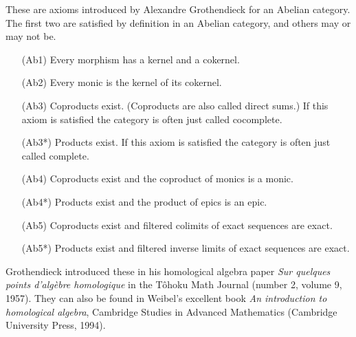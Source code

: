 \documentclass{article}
\begin{document}
These are axioms introduced by Alexandre Grothendieck for an Abelian category.  The first two are satisfied by definition in an Abelian category, and others may or may not be.

\begin{itemize}
  \item[(Ab1)] Every morphism has a kernel and a cokernel.
  \item[(Ab2)] Every monic is the kernel of its cokernel.
  \item[(Ab3)] Coproducts exist.  (Coproducts are also called direct sums.)  If this axiom is satisfied the category is often just called cocomplete.
  \item[(Ab3*)] Products exist.  If this axiom is satisfied the category is often just called complete.
  \item[(Ab4)] Coproducts exist and the coproduct of monics is a monic.
  \item[(Ab4*)] Products exist and the product of epics is an epic.
  \item[(Ab5)] Coproducts exist and filtered colimits of exact sequences are exact.
  \item[(Ab5*)] Products exist and filtered inverse limits of exact sequences are exact.
\end{itemize}

Grothendieck introduced these in his homological algebra paper \emph{Sur quelques points d'alg\`ebre homologique} in the T\^ohoku Math Journal (number 2, volume 9, 1957).  They can also be found in Weibel's excellent book \emph{An introduction to homological algebra}, Cambridge Studies in Advanced Mathematics (Cambridge University Press, 1994).
\end{document}
